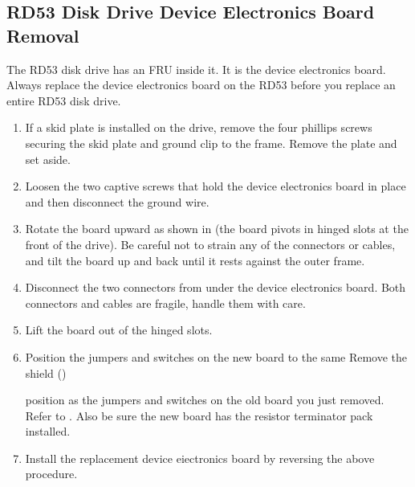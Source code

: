 \subsection{RD53 Disk Drive Device Electronics Board Removal}

The RD53 disk drive has an FRU inside it. It is the device electronics board.
Always replace the device electronics board on the RD53 before you replace
an entire RD53 disk drive.

\begin{enumerate}

\item	If a skid plate is installed on the drive, remove the four phillips screws
		securing the skid plate and ground clip to the frame. Remove the plate
		and set aside.

\item	Loosen the two captive screws that hold the device electronics board in
		place and then disconnect the ground wire.

\item	Rotate the board upward as shown in  (the board pivots in
		hinged slots at the front of the drive). Be careful not to strain any of
		the connectors or cables, and tilt the board up and back until it rests
		against the outer frame.



\item	Disconnect the two connectors from under the device electronics board.
		Both connectors and cables are fragile, handle them with care.

\item	Lift the board out of the hinged slots.

\newpage

\item	Position the jumpers and switches on the new board to the same 
Remove the shield ()

		position as the jumpers and switches on the old board you just removed.
		Refer to . Also be sure the new board has the resistor 
		terminator pack installed.


\item	Install the replacement device eiectronics board by reversing the above procedure.

\end{enumerate}

